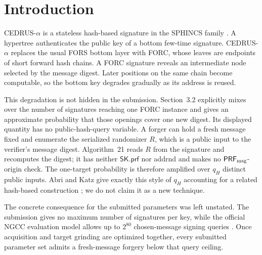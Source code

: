\documentclass[11pt,a4paper]{article}
\newcommand{\PRFmsg}{\ensuremath{\mathsf{PRF}_{\rm msg}}}
\newcommand{\sk}{\ensuremath{\mathsf{SK}}}
\begin{document}
\section{Introduction}

CEDRUS-$\alpha$ is a stateless hash-based signature in the SPHINCS family
\cite{cedrus-spec,cedrus-framework}.  A hypertree authenticates the public key
of a bottom few-time signature.  CEDRUS-$\alpha$ replaces the usual FORS
bottom layer with FORC, whose leaves are endpoints of short forward hash
chains.  A FORC signature reveals an intermediate node selected by the message
digest.  Later positions on the same chain become computable, so the bottom key
degrades gradually as its address is reused.

This degradation is not hidden in the submission.  Section~3.2 explicitly
mixes over the number of signatures reaching one FORC instance and gives an
approximate probability that those openings cover one new digest.  Its
displayed quantity has no public-hash-query variable.  A forger can hold a
fresh message fixed and enumerate the serialized randomizer $R$, which is a
public input to the verifier's message digest.  Algorithm~21 reads $R$ from the
signature and recomputes the digest; it has neither $\sk.\mathsf{prf}$ nor
\textsf{addrnd} and makes no $\PRFmsg$-origin check.  The one-target probability
is therefore amplified over
$q_H$ distinct public inputs.  Abri and Katz give exactly this style of
$q_H$ accounting for a related hash-based construction
\cite[Eq.~(2)]{abri-katz}; we do not claim it as a new technique.

The concrete consequence for the submitted parameters was left unstated.  The
submission gives no maximum number of signatures per key, while the official
NGCC evaluation model allows up to $2^{80}$ chosen-message signing queries
\cite{ngcc-criteria}.  Once acquisition and target grinding are optimized
together, every submitted parameter set admits a fresh-message forgery below
that query ceiling.
\end{document}
